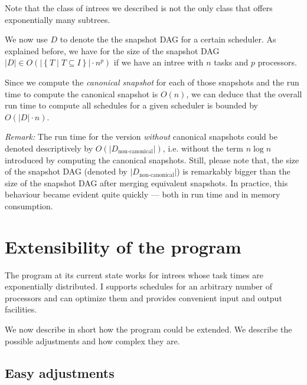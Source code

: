 Note that the class of intrees we described is not the only class that offers exponentially many subtrees.

We now use $D$ to denote the the snapshot DAG for a certain scheduler. As explained before, we have for the size of the snapshot DAG $|D|\in O\left(|\left\{ T \mid T\subseteq I \right\}|\cdot n^p\right)$ if we have an intree with $n$ tasks and $p$ processors.

Since we compute the \emph{canonical snapshot} for each of those snapshots and the run time to compute the canonical snapshot is $O(n)$, we can deduce that the overall run time to compute all schedules for a given scheduler is bounded by $O(|D| \cdot n)$.

\emph{Remark:} The run time for the version \emph{without} canonical snapshots could be denoted descriptively by $O(|D_{\text{non-canonical}}|)$, i.e. without the term $n\log n$ introduced by computing the canonical snapshots. Still, please note that, the size of the snapshot DAG (denoted by $|D_{\text{non-canonical}}|$) is remarkably bigger than the size of the snapshot DAG after merging equivalent snapshots. In practice, this behaviour became evident quite quickly --- both in run time and in memory consumption.

\section{Extensibility of the program}
\label{sec:implementation-extending-program}

The program at its current state works for intrees whose task times are exponentially distributed. I supports schedules for an arbitrary number of processors and can optimize them and provides convenient input and output facilities.

We now describe in short how the program could be extended. We describe the possible adjustments and how complex they are.

\subsection{Easy adjustments}
\label{sec:implementation-extensions-easy}

